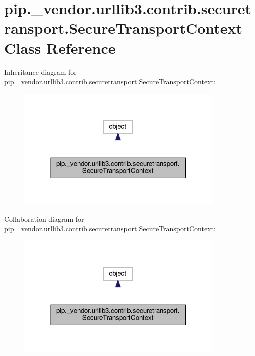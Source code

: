 \hypertarget{classpip_1_1__vendor_1_1urllib3_1_1contrib_1_1securetransport_1_1SecureTransportContext}{}\section{pip.\+\_\+vendor.\+urllib3.\+contrib.\+securetransport.\+Secure\+Transport\+Context Class Reference}
\label{classpip_1_1__vendor_1_1urllib3_1_1contrib_1_1securetransport_1_1SecureTransportContext}


Inheritance diagram for pip.\+\_\+vendor.\+urllib3.\+contrib.\+securetransport.\+Secure\+Transport\+Context\+:
\nopagebreak
\begin{figure}[H]
\begin{center}
\leavevmode
\includegraphics[width=281pt]{classpip_1_1__vendor_1_1urllib3_1_1contrib_1_1securetransport_1_1SecureTransportContext__inherit__graph}
\end{center}
\end{figure}


Collaboration diagram for pip.\+\_\+vendor.\+urllib3.\+contrib.\+securetransport.\+Secure\+Transport\+Context\+:
\nopagebreak
\begin{figure}[H]
\begin{center}
\leavevmode
\includegraphics[width=281pt]{classpip_1_1__vendor_1_1urllib3_1_1contrib_1_1securetransport_1_1SecureTransportContext__coll__graph}
\end{center}
\end{figure}

